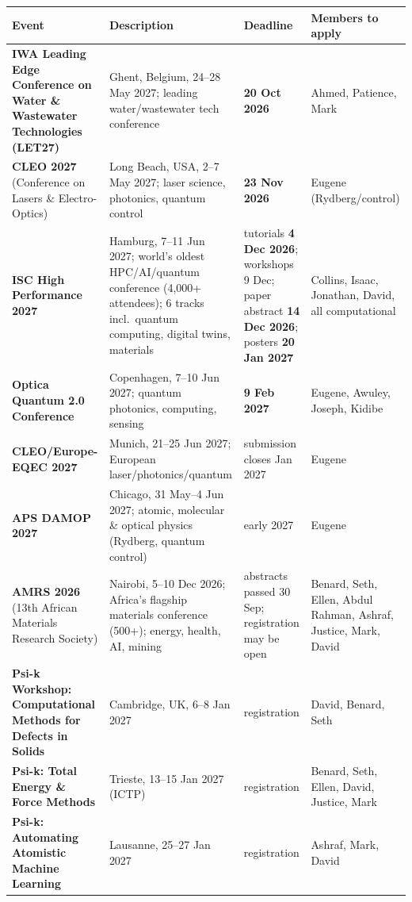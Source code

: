 \documentclass[11pt,a4paper]{article}
\begin{document}
\begin{longtable}{@{}p{3.3cm}p{5.6cm}p{2.2cm}p{2.8cm}@{}}
\toprule
\textbf{Event} & \textbf{Description} & \textbf{Deadline} & \textbf{Members to apply} \\
\midrule
\endhead
\textbf{IWA Leading Edge Conference on Water \& Wastewater Technologies (LET27)} & Ghent, Belgium, 24--28 May 2027; leading water/wastewater tech conference & \textbf{20 Oct 2026} & Ahmed, Patience, Mark \\
\midrule
\textbf{CLEO 2027} (Conference on Lasers \& Electro-Optics) & Long Beach, USA, 2--7 May 2027; laser science, photonics, quantum control & \textbf{23 Nov 2026} & Eugene (Rydberg/control) \\
\midrule
\textbf{ISC High Performance 2027} & Hamburg, 7--11 Jun 2027; world's oldest HPC/AI/quantum conference (4{,}000+ attendees); 6 tracks incl.\ quantum computing, digital twins, materials & tutorials \textbf{4 Dec 2026}; workshops 9 Dec; paper abstract \textbf{14 Dec 2026}; posters \textbf{20 Jan 2027} & Collins, Isaac, Jonathan, David, all computational \\
\midrule
\textbf{Optica Quantum 2.0 Conference} & Copenhagen, 7--10 Jun 2027; quantum photonics, computing, sensing & \textbf{9 Feb 2027} & Eugene, Awuley, Joseph, Kidibe \\
\midrule
\textbf{CLEO/Europe-EQEC 2027} & Munich, 21--25 Jun 2027; European laser/photonics/quantum & submission closes Jan 2027 & Eugene \\
\midrule
\textbf{APS DAMOP 2027} & Chicago, 31 May--4 Jun 2027; atomic, molecular \& optical physics (Rydberg, quantum control) & early 2027 & Eugene \\
\midrule
\textbf{AMRS 2026} (13th African Materials Research Society) & Nairobi, 5--10 Dec 2026; Africa's flagship materials conference (500+); energy, health, AI, mining & abstracts passed 30 Sep; registration may be open & Benard, Seth, Ellen, Abdul Rahman, Ashraf, Justice, Mark, David \\
\midrule
\textbf{Psi-k Workshop: Computational Methods for Defects in Solids} & Cambridge, UK, 6--8 Jan 2027 & registration & David, Benard, Seth \\
\midrule
\textbf{Psi-k: Total Energy \& Force Methods} & Trieste, 13--15 Jan 2027 (ICTP) & registration & Benard, Seth, Ellen, David, Justice, Mark \\
\midrule
\textbf{Psi-k: Automating Atomistic Machine Learning} & Lausanne, 25--27 Jan 2027 & registration & Ashraf, Mark, David \\

\end{longtable}
\end{document}
